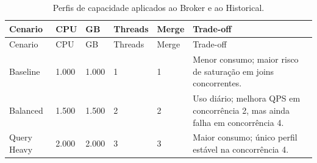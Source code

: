 {
\small
\setlength{\tabcolsep}{4pt}
\renewcommand{\arraystretch}{1.15}
\begin{longtable}{p{}p{}p{}p{}p{}p{}}
\caption{Perfis de capacidade aplicados ao Broker e ao Historical.}\\
\toprule
Cenario & CPU & GB & Threads & Merge & Trade-off \\
\midrule
\endfirsthead
\toprule
Cenario & CPU & GB & Threads & Merge & Trade-off \\
\midrule
\endhead
Baseline & 1.000 & 1.000 & 1 & 1 & Menor consumo; maior risco de saturação em joins concorrentes. \\
Balanced & 1.500 & 1.500 & 2 & 2 & Uso diário; melhora QPS em concorrência 2, mas ainda falha em concorrência 4. \\
Query Heavy & 2.000 & 2.000 & 3 & 3 & Maior consumo; único perfil estável na concorrência 4. \\
\bottomrule
\end{longtable}
}
